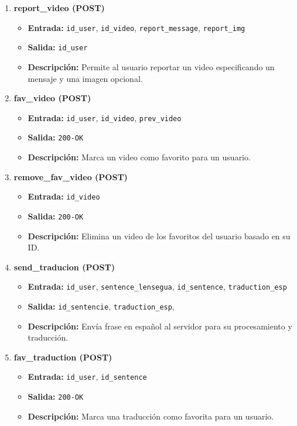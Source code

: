 \begin{enumerate}
    \item \textbf{report\_video (POST)}
    \begin{itemize}
        \item \textbf{Entrada:} \texttt{id\_user}, \texttt{id\_video}, \texttt{report\_message}, \texttt{report\_img}
        \item \textbf{Salida:} \texttt{id\_user}
        \item \textbf{Descripción:} Permite al usuario reportar un video especificando un mensaje y una imagen opcional.
    \end{itemize}

    \item \textbf{fav\_video (POST)}
    \begin{itemize}
        \item \textbf{Entrada:} \texttt{id\_user}, \texttt{id\_video}, \texttt{prev\_video}
        \item \textbf{Salida:} \texttt{200-OK}
        \item \textbf{Descripción:} Marca un video como favorito para un usuario.
    \end{itemize}


    \item \textbf{remove\_fav\_video (POST)}
    \begin{itemize}
        \item \textbf{Entrada:} \texttt{id\_video}
        \item \textbf{Salida:} \texttt{200-OK}
        \item \textbf{Descripción:} Elimina un video de los favoritos del usuario basado en su ID.
    \end{itemize}

    \item \textbf{send\_traducion (POST)}
    \begin{itemize}
        \item \textbf{Entrada:} \texttt{id\_user}, \texttt{sentence\_lensegua}, \texttt{id\_sentence}, \texttt{traduction\_esp}
        \item \textbf{Salida:} \texttt{id\_sentencie}, \texttt{traduction\_esp},
        \item \textbf{Descripción:} Envía frase en español al servidor para su procesamiento y traducción.
    \end{itemize}

    \item \textbf{fav\_traduction (POST)}
    \begin{itemize}
        \item \textbf{Entrada:} \texttt{id\_user}, \texttt{id\_sentence}
        \item \textbf{Salida:} \texttt{200-OK}
        \item \textbf{Descripción:} Marca una traducción como favorita para un usuario.
    \end{itemize}


\end{enumerate}
